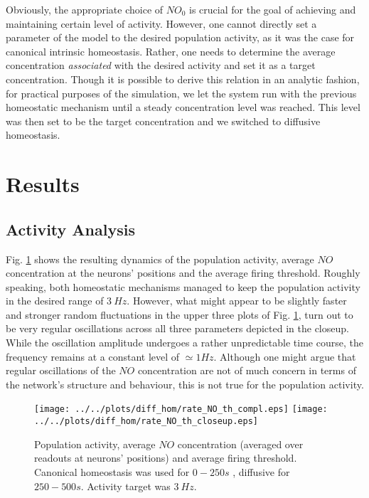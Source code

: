 \documentclass[10pt,a4paper]{article}
\begin{document}
Obviously, the appropriate choice of $NO_0$ is crucial for the goal of achieving and maintaining certain level of activity. However, one cannot directly set a parameter of the model to the desired population activity, as it was the case for canonical intrinsic homeostasis. Rather, one needs to determine the average concentration \textit{associated} with the desired activity and set it as a target concentration. Though it is possible to derive this relation in an analytic fashion, for practical purposes of the simulation, we let the system run with the previous homeostatic mechanism until a steady concentration level was reached. This level was then set to be the target concentration and we switched to diffusive homeostasis.

\section{Results} \label{results}
\subsection{Activity Analysis} \label{activ_analys}
Fig. \ref{full_sim_plots_av} shows the resulting dynamics of the population activity, average $NO$ concentration at the neurons' positions and the average firing threshold. Roughly speaking, both homeostatic mechanisms managed to keep the population activity in the desired range of $3~Hz$. However, what might appear to be slightly faster and stronger random fluctuations in the upper three plots of Fig. \ref{full_sim_plots_av}, turn out to be very regular oscillations across all three parameters depicted in the closeup. While the oscillation amplitude undergoes a rather unpredictable time course, the frequency remains at a constant level of $\simeq 1Hz$. Although one might argue that regular oscillations of the $NO$ concentration are not of much concern in terms of the network's structure and behaviour, this is not true for the population activity.
\begin{figure}
\texttt{[image: ../../plots/diff\_hom/rate\_NO\_th\_compl.eps]}
\texttt{[image: ../../plots/diff\_hom/rate\_NO\_th\_closeup.eps]}
\caption{Population activity, average $NO$ concentration (averaged over readouts at neurons' positions) and average firing threshold. Canonical homeostasis was used for $0-250s$ , diffusive for $250-500s$. Activity target was $3 ~Hz$.}
\label{full_sim_plots_av}
\end{figure}
\end{document}
